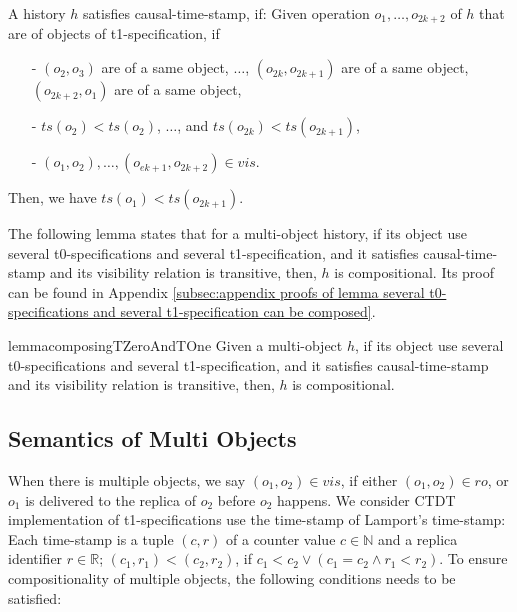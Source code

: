 A history $h$ satisfies causal-time-stamp, if: Given operation $o_1,\ldots,o_{\mathit{2k+2}}$ of $h$ that are of objects of t1-specification, if

\begin{itemize}
\setlength{\itemsep}{0.5pt}
\item[-] $(o_2,o_3)$ are of a same object, $\ldots$, $(o_{\mathit{2k}},o_{\mathit{2k+1}})$ are of a same object, $(o_{\mathit{2k+2}},o_1)$ are of a same object,

\item[-] $\mathit{ts}(o_2) < \mathit{ts}(o_2)$, $\ldots$, and $\mathit{ts}(o_{\mathit{2k}}) < \mathit{ts}(o_{\mathit{2k+1}})$,

\item[-] $(o_1,o_2), \ldots, (o_{\mathit{ek+1}},o_{\mathit{2k+2}}) \in \mathit{vis}$.
\end{itemize}

Then, we have $\mathit{ts}(o_1) < \mathit{ts}(o_{\mathit{2k+1}})$.

The following lemma states that for a multi-object history, if its object use several t0-specifications and several t1-specification, and it satisfies causal-time-stamp and its visibility relation is transitive, then, $h$ is compositional. Its proof can be found in Appendix \ref{subsec:appendix proofs of lemma several t0-specifications and several t1-specification can be composed}.

\begin{restatable}{lemma}{composingTZeroAndTOne}
\label{lemma:several t0-specifications and several t1-specification can be composed}
Given a multi-object $h$, if its object use several t0-specifications and several t1-specification, and it satisfies causal-time-stamp and its visibility relation is transitive, then, $h$ is compositional.
\end{restatable}





\subsection{Semantics of Multi Objects}
\label{subsec:semantics of multi objects}

When there is multiple objects, we say $(o_1,o_2) \in \mathit{vis}$, if either $(o_1,o_2) \in \mathit{ro}$, or $o_1$ is delivered to the replica of $o_2$ before $o_2$ happens. We consider CTDT implementation of t1-specifications use the time-stamp of Lamport's time-stamp: Each time-stamp is a tuple $(c,r)$ of a counter value $c \in \mathbb{N}$ and a replica identifier $r \in \mathbb{R}$; $(c_1,r_1) < (c_2,r_2)$, if $c_1 < c_2 \vee (c_1 = c_2 \wedge r_1 < r_2)$. To ensure compositionality of multiple objects, the following conditions needs to be satisfied:

